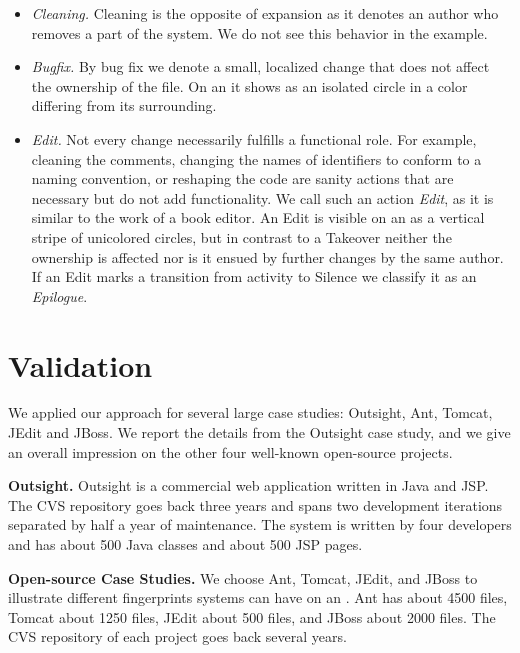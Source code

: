 \begin{itemize}
\item \emph{Cleaning.} Cleaning is the opposite of expansion as it denotes an author who removes a part of the system. We do not see this behavior in the example.

\item \emph{Bugfix.} By bug fix we denote a small, localized change that does not affect the ownership of the file. On an \omap it shows as an isolated circle in a color differing from its surrounding.

\item \emph{Edit.} Not every change necessarily fulfills a functional role. For example, cleaning the comments, changing the names of identifiers to conform to a naming convention, or reshaping the code are sanity actions that are necessary but do not add functionality. We call such an action \emph{Edit}, as it is similar to the work of a book editor. An Edit is visible on an \omap as a vertical stripe of unicolored circles, but in contrast to a Takeover neither the ownership is affected nor is it ensued by further changes by the same author. If an Edit marks a transition from activity to Silence we classify it as an \emph{Epilogue}.

\end{itemize}

\section{Validation}\label{sec:validation}

We applied our approach for several large case studies: Outsight, Ant, Tomcat, JEdit and JBoss. We report the details from the Outsight case study, and we give an overall impression on the other four well-known open-source projects.

\textbf{Outsight.} Outsight is a commercial web application written in Java and JSP. The CVS repository goes back three years and spans two development iterations separated by half a year of maintenance. The system is written by four developers and has about 500 Java classes and about 500 JSP pages.

\textbf{Open-source Case Studies.} We choose Ant, Tomcat, JEdit, and JBoss to illustrate different fingerprints systems can have on an \omap. Ant has about 4500 files, Tomcat about 1250 files, JEdit about 500 files, and JBoss about 2000 files. The CVS repository of each project goes back several years.

